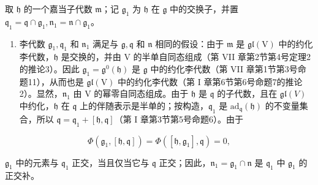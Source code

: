 取 \(\mathfrak{h}\) 的一个嘉当子代数 \(\mathfrak{m}\)；记 \(\mathfrak{g}_1\) 为 \(\mathfrak{h}\) 在 \(\mathfrak{g}\) 中的交换子，并置 \(\mathfrak{q}_1 = \mathfrak{q} \cap \mathfrak{g}_1, \mathfrak{n}_1 = \mathfrak{n} \cap \mathfrak{g}_1\)。

\begin{enumerate}
\def\labelenumi{\alph{enumi})}
\setcounter{enumi}{2}
\tightlist
\item
  李代数 \(\mathfrak{g}_1, \mathfrak{q}_1\) 和 \(\mathfrak{n}_1\) 满足与 \(\mathfrak{g}, \mathfrak{q}\) 和 \(\mathfrak{n}\) 相同的假设：由于 \(\mathfrak{m}\) 是 \(\mathfrak{gl}(\mathrm{V})\) 中的约化李代数，\(\mathfrak{h}\) 是交换的，并由 V 的半单自同态组成（第 VII 章第2节第4号定理2的推论3）。因此 \(\mathfrak{g}_1 = \mathfrak{g}^0(\mathfrak{h})\) 是 \(\mathfrak{g}\) 中的约化李代数（第 VII 章第1节第3号命题11），从而也是 \(\mathfrak{gl}(\mathrm{V})\) 中的约化李代数（第 I 章第6节第6号命题7的推论2）。显然，\(\mathfrak{n}_1\) 由 V 的幂零自同态组成。由于 \(\mathfrak{h}\) 是 \(\mathfrak{q}\) 的子代数，且在 \(\mathfrak{gl}(V)\) 中约化，\(\mathfrak{h}\) 在 \(\mathfrak{q}\) 上的伴随表示是半单的；按构造，\(\mathfrak{q}_1\) 是 \(\mathrm{ad}_{\mathfrak{q}}(\mathfrak{h})\) 的不变量集合，所以 \(\mathfrak{q} = \mathfrak{q}_1 + [\mathfrak{h}, \mathfrak{q}]\)（第 I 章第3节第5号命题6）。由于
\end{enumerate}

\[
\Phi (\mathfrak {g} _ {1}, [ \mathfrak {h}, \mathfrak {q} ]) = \Phi ([ \mathfrak {h}, \mathfrak {g} _ {1} ], \mathfrak {q}) = 0,
\]

\(\mathfrak{g}_1\) 中的元素与 \(\mathfrak{q}_1\) 正交，当且仅当它与 \(\mathfrak{q}\) 正交；因此，\(\mathfrak{n}_1 = \mathfrak{g}_1 \cap \mathfrak{n}\) 是 \(\mathfrak{q}_1\) 中 \(\mathfrak{g}_1\) 的正交补。

